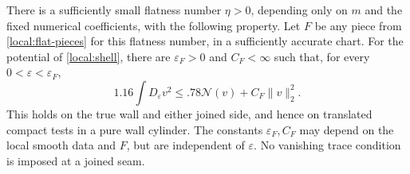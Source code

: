 \begin{proposition}\label{local:sharp}
There is a sufficiently small flatness number $\eta>0$, depending
only on $m$ and the fixed numerical coefficients, with the following
property.  Let $F$ be any piece from \cref{local:flat-pieces} for this
flatness number, in a sufficiently accurate chart.  For the potential
of \cref{local:shell}, there are $\varepsilon_F>0$ and $C_F<\infty$
such that, for every $0<\varepsilon<\varepsilon_F$,
\begin{equation}\label{local:sharp-estimate}
 1.16\int D_\varepsilon v^2
           \le .78\mathcal N(v)+C_F\|v\|_2^2.
\end{equation}
This holds on the true wall and either joined side, and hence on
translated compact tests in a pure wall cylinder.  The constants
$\varepsilon_F,C_F$ may depend on the local smooth data and $F$,
but are independent of $\varepsilon$.  No vanishing trace condition
is imposed at a joined seam.
\end{proposition}
